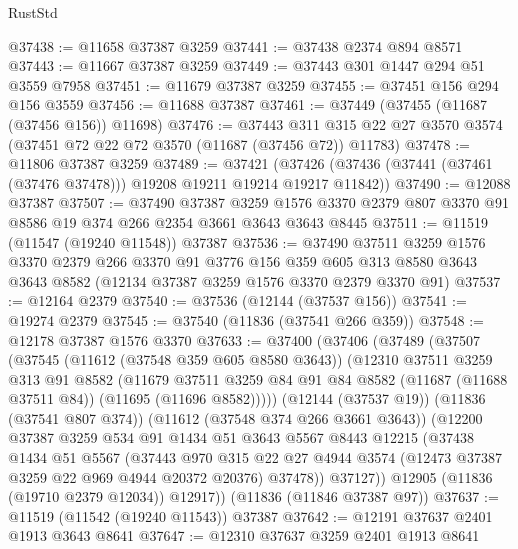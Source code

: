 \begin{lexlean}{RustStd}
\begin{coremodule}
@37438 := @11658 @37387 @3259
@37441 := @37438 @2374 @894 @8571
@37443 := @11667 @37387 @3259
@37449 := @37443 @301 @1447 @294 @51 @3559 @7958
@37451 := @11679 @37387 @3259
@37455 := @37451 @156 @294 @156 @3559
@37456 := @11688 @37387
@37461 := @37449 (@37455 (@11687 (@37456 @156)) @11698)
@37476 := @37443
    @311
    @315
    @22
    @27
    @3570
    @3574
    (@37451 @72 @22 @72 @3570 (@11687 (@37456 @72)) @11783)
@37478 := @11806 @37387 @3259
@37489 := @37421
    (@37426 (@37436 (@37441 (@37461 (@37476 @37478))) @19208 @19211 @19214 @19217 @11842))
@37490 := @12088 @37387
@37507 := @37490
    @37387
    @3259
    @1576
    @3370
    @2379
    @807
    @3370
    @91
    @8586
    @19
    @374
    @266
    @2354
    @3661
    @3643
    @3643
    @8445
@37511 := @11519 (@11547 (@19240 @11548)) @37387
@37536 := @37490
    @37511
    @3259
    @1576
    @3370
    @2379
    @266
    @3370
    @91
    @3776
    @156
    @359
    @605
    @313
    @8580
    @3643
    @3643
    @8582
    (@12134 @37387 @3259 @1576 @3370 @2379 @3370 @91)
@37537 := @12164 @2379
@37540 := @37536 (@12144 (@37537 @156))
@37541 := @19274 @2379
@37545 := @37540 (@11836 (@37541 @266 @359))
@37548 := @12178 @37387 @1576 @3370
@37633 := @37400
    (@37406
      (@37489
        (@37507
          (@37545
            (@11612 (@37548 @359 @605 @8580 @3643))
            (@12310
              @37511
              @3259
              @313
              @91
              @8582
              (@11679
                @37511
                @3259
                @84
                @91
                @84
                @8582
                (@11687 (@11688 @37511 @84))
                (@11695 (@11696 @8582)))))
          (@12144 (@37537 @19))
          (@11836 (@37541 @807 @374))
          (@11612 (@37548 @374 @266 @3661 @3643))
          (@12200
            @37387
            @3259
            @534
            @91
            @1434
            @51
            @3643
            @5567
            @8443
            @12215
            (@37438
              @1434
              @51
              @5567
              (@37443
                @970
                @315
                @22
                @27
                @4944
                @3574
                (@12473 @37387 @3259 @22 @969 @4944 @20372 @20376)
                @37478))
            @37127))
        @12905
        (@11836 (@19710 @2379 @12034))
        @12917))
    (@11836 (@11846 @37387 @97))
@37637 := @11519 (@11542 (@19240 @11543)) @37387
@37642 := @12191 @37637 @2401 @1913 @3643 @8641
@37647 := @12310 @37637 @3259 @2401 @1913 @8641

\end{coremodule}
\end{lexlean}
